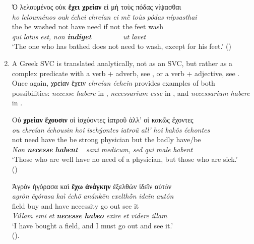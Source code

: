 \documentclass[output=paper,colorlinks,citecolor=brown]{langscibook}
\begin{document}
\begin{enumerate}
\ex\label{ex:bj:15d}

\gllll Ὁ λελουμένος οὐκ \textbf{ἔχει} \textbf{χρείαν} εἰ μὴ τοὺς πόδας νίψασθαι\\
 \textit{ho} \textit{lelouménos} \textit{ouk} \textit{échei} \textit{chreían} \textit{ei} \textit{mḕ} \textit{toùs} \textit{pódas} \textit{nípsasthai}\\
the {be washed} not have need if not the feet wash\\
\emph{qui} {\emph{lotus} \emph{est,}} \emph{non} \textbf{\itshape indiget} ~ ~ ~ ~ ~ {\emph{ut} \emph{lavet}}\\
\glt `The one who has bathed does not need to wash, except for his feet.' ()

\z

\z

\item A Greek SVC is translated analytically, not as an SVC, but rather as a complex
  predicate with a verb + adverb, see , or a verb + adjective, see .
  Once again, χρείαν ἔχειν \emph{chreían échein} provides examples of both
  possibilities: \emph{necesse habere} in , \emph{necessarium esse} in
  , and \emph{necessarium habere} in .


\ea\label{ex:bj:16}

\ea\label{ex:bj:16a}

\gllll Οὐ \textbf{χρείαν} \textbf{ἔχουσιν} οἱ ἰσχύοντες ἰατροῦ ἀλλ' οἱ κακῶς ἔχοντες\\
 \textit{ou} \textit{chreían} \textit{échousin} \textit{hoi} \textit{ischýontes} \textit{iatroû} \textit{all'} \textit{hoi} \textit{kakôs} \textit{échontes}\\
not need have the {be strong} physician but the badly have/be\\
\emph{Non} \textbf{\itshape necesse} \textbf{\itshape habent} ~  \emph{sani} \emph{medicum,} \emph{sed} \emph{qui} \emph{male} \emph{habent}\\
\glt `Those who are well have no need of a physician, but those who are sick.' \\
\hspace*{\fill}()

\ex\label{ex:bj:16b}

\gllll  Ἀγρὸν ἠγόρασα καὶ \textbf{ἔχω} \textbf{ἀνάγκην} ἐξελθὼν ἰδεῖν αὐτóν\\
 \textit{agròn} \textit{ēgórasa} \textit{kaì} \textit{échō} \textit{anánkēn} \textit{exelthṑn} \textit{ideîn} \textit{autón}\\
field buy and have necessity {go out} see it\\
\emph{Villam} \emph{emi} \emph{et} \textbf{\itshape necesse} \textbf{\itshape habeo} {\emph{exire} \emph{et}} \emph{videre} \emph{illam}\\
\glt `I have bought a field, and I must go out and see it.' \\
\hspace*{\fill}().


\end{enumerate}
\end{document}
